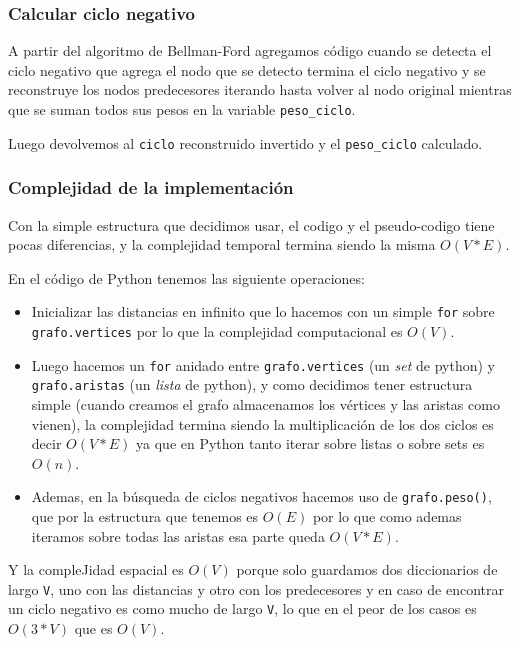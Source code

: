 \documentclass[titlepage,a4paper]{article}
\begin{document}
\subsubsection{Calcular ciclo negativo}
\label{sec:orgb87fd12}

A partir del algoritmo de Bellman-Ford agregamos código cuando se detecta el
ciclo negativo que agrega el nodo que se detecto termina el ciclo negativo y se
reconstruye los nodos predecesores iterando hasta volver al nodo original
mientras que se suman todos sus pesos en la variable \texttt{peso\_ciclo}.

Luego devolvemos al \texttt{ciclo} reconstruido invertido y el \texttt{peso\_ciclo} calculado.

\subsubsection{Complejidad de la implementación}
\label{sec:org7d51c83}

Con la simple estructura que decidimos usar, el codigo y el pseudo-codigo tiene
pocas diferencias, y la complejidad temporal termina siendo la misma \(O(V * E)\).

En el código de Python tenemos las siguiente operaciones:
\begin{itemize}
\item Inicializar las distancias en infinito que lo hacemos con un simple \texttt{for}
sobre \texttt{grafo.vertices} por lo que la complejidad computacional es \(O(V)\).
\item Luego hacemos un \texttt{for} anidado entre \texttt{grafo.vertices} (un \emph{set} de python) y
\texttt{grafo.aristas} (un \emph{lista} de python), y como decidimos tener estructura
simple (cuando creamos el grafo almacenamos los vértices y las aristas como
vienen), la complejidad termina siendo la multiplicación de los dos ciclos es
decir \(O(V * E)\) ya que en Python tanto iterar sobre listas o sobre sets es
\(O(n)\).
\item Ademas, en la búsqueda de ciclos negativos hacemos uso de \texttt{grafo.peso()}, que
por la estructura que tenemos es \(O(E)\) por lo que como ademas iteramos sobre
todas las aristas esa parte queda \(O(V * E)\).
\end{itemize}

Y la compleJidad espacial es \(O(V)\) porque solo guardamos dos diccionarios de
largo \texttt{V}, uno con las distancias y otro con los predecesores y en caso de
encontrar un ciclo negativo es como mucho de largo \texttt{V}, lo que en el peor de los
casos es \(O(3*V)\) que es \(O(V)\).
\end{document}
